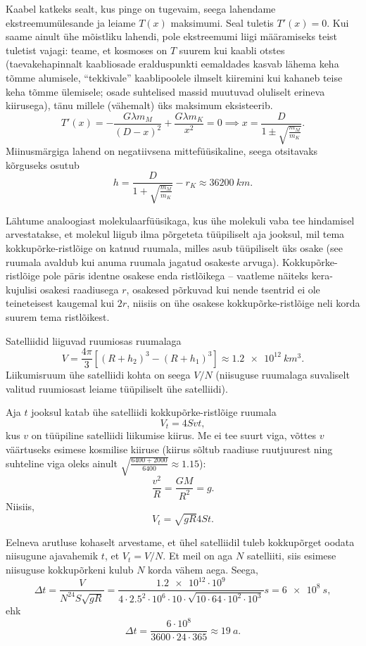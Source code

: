 \documentclass[10pt, twoside]{article}
\begin{document}
{Kaabel katkeks sealt, kus pinge on tugevaim, seega lahendame
ekst\-ree\-mum\-üles\-an\-de
ja leiame $T(x)$ maksimumi. Seal tuletis $T'(x)=0$. Kui saame ainult ühe mõistliku lahendi, pole
ekstreemumi liigi määramiseks teist tuletist vajagi: teame, et kosmoses on $T$
suurem kui kaabli otstes (taevakehapinnalt kaabliosade eralduspunkti
eemaldades kasvab lähema keha tõmme alumisele, \enquote{tekkivale} kaablipoolele ilmselt kiiremini
kui kahaneb teise keha tõmme ülemisele; osade suhtelised massid muutuvad
oluliselt erineva kiirusega), tänu millele (vähemalt) üks maksimum eksisteerib.
\[ 
T'(x) = - \frac{ G\lambda m_M }{ (D-x)^2 } + \frac{ G\lambda m_K }{ x^2 } = 0
\implies x = \frac{D}{1 \pm \sqrt{\frac{m_M}{m_K}}}.
\]
Miinusmärgiga lahend on negatiivsena mittefüüsikaline, seega otsitavaks
kõr\-gu\-seks osutub
\[ 
h = \frac{D}{1 + \sqrt{\frac{m_M}{m_K}}} - r_K \approx
\SI{36200}{km}.
\]
\probend
\bigskip


\solu
Lähtume analoogiast molekulaarfüüsikaga, kus ühe molekuli vaba tee hindamisel arvestatakse, et molekul liigub ilma põrgeteta tüüpiliselt aja jooksul, mil tema kokkupõrke-ristlõige on katnud ruumala, milles asub tüüpiliselt üks osake (see ruumala avaldub kui anuma ruumala jagatud osakeste arvuga). Kokkupõrke-ristlõige pole päris identne osakese enda ristlõikega -- vaatleme näiteks kera-kujulisi osakesi raadiusega $r$, osakesed põrkuvad kui nende tsentrid ei ole teineteisest kaugemal kui $2r$, niisiis on ühe osakese kokkupõrke-ristlõige neli korda suurem tema ristlõikest.

Satelliidid liiguvad ruumiosas ruumalaga
\[ V=\frac{4\pi}{3}\left[(R+h_2)^3-(R+h_1)^3\right]\approx \SI{1.2e12}{km^3}.\]
Liikumisruum ühe satelliidi kohta on seega $V/N$ (niisuguse ruumalaga suvaliselt valitud ruumiosast leiame tüüpiliselt ühe satelliidi).

Aja $t$ jooksul katab ühe satelliidi kokkupõrke-ristlõige ruumala
\[V_t=4Svt,\]
kus $v$ on tüüpiline satelliidi liikumise kiirus. Me ei tee suurt viga, võttes $v$ väärtuseks esimese kosmilise kiiruse (kiirus sõltub raadiuse ruutjuurest ning suhteline viga oleks ainult \mbox{$\sqrt{\frac{6400+2000}{6400}}\approx\num{1.15}$}):
\[\frac{v^2}{R}=\frac{GM}{R^2}=g.\]
Niisiis,
\[V_t=\sqrt{gR}4St.\]

Eelneva arutluse kohaselt arvestame, et ühel satelliidil tuleb kokkupõrget oodata niisugune ajavahemik $t$, et $V_t=V/N$. Et meil on aga $N$ satelliiti, siis esimese niisuguse kokkupõrkeni kulub $N$ korda vähem aega. Seega,
\[
\Delta t=\frac{V}{N^24S\sqrt{gR}}=\frac{\num{1.2e12}\cdot 10^9}{\num{4}\cdot\num{2.5}^2\cdot 10^6\cdot \num{10}\cdot \sqrt{10 \cdot \num{64} \cdot 10^2\cdot 10^3}}s=\SI{6e8}{s},
\]
ehk
\[
\Delta t=\frac{6\cdot10^{8}}{3600\cdot24\cdot365}\approx \SI{19}{a}.
\]
\probend
\bigskip

}
\end{document}
